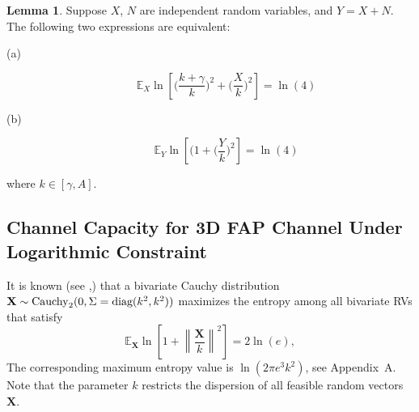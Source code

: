 \documentclass[conference]{IEEEtran}
\newcommand{\E}{\mathbb{E}}
\theoremstyle{definition}
\newtheorem{lma}{Lemma}
\theoremstyle{plain}
\newcommand{\norm}[1]{\left\lVert#1\right\rVert}
\begin{document}
\begin{lma}
Suppose $X$, $N$ are independent random variables, and $Y=X+N$. The following two expressions are equivalent:
\begin{description}
\item[(a)]
\begin{equation}
\E_X \ln \left[
    \Big(\frac{k+\gamma}{k}\Big)^2
    +\Big(\frac{X}{k}\Big)^2
    \right] = \ln(4)
\end{equation}
\item[(b)]
\begin{equation}
\E_Y \ln \left[
    \Big(
    1
    +\Big(\frac{Y}{k}\Big)^2
    \right] = \ln(4)
\end{equation}
\end{description}
where $k\in[\gamma,A]$.
\label{lma:L4}
\end{lma}
\fi

\subsection{Channel Capacity for 3D FAP Channel Under Logarithmic Constraint}\label{MR-C}
\color{black}

It is known (see \cite{kapur1989maximum},\cite{kotz2004multivariate}) that a bivariate Cauchy distribution $\mathbf{X}\sim{\rm Cauchy}_2 (0,\Sigma=\text{diag}(k^2,k^2))$ maximizes the entropy among all bivariate RVs that satisfy 
\begin{equation}
\E_{\mathbf{X}} \ln \left[1+\norm{\frac{\mathbf{X}}{k}}^2\right] = 2\ln\left(e\right),
\end{equation}
The corresponding maximum entropy value is $\ln(2\pi e^3 k^2)$, see Appendix~A. Note that
the parameter $k$ restricts the dispersion of all feasible random vectors $\mathbf{X}$.
\end{document}
